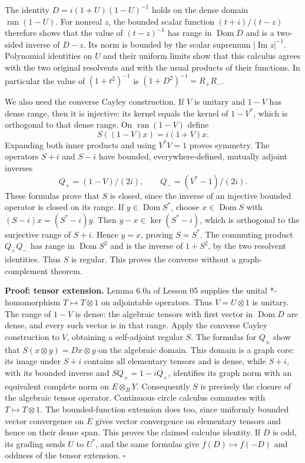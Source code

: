 \documentclass[
  11pt,
]{article}
\begin{document}
The identity \(D=i(1+U)(1-U)^{-1}\) holds on the dense domain
\(\operatorname{ran}(1-U)\). For nonreal \(z\), the bounded scalar
function \((t+i)/(t-z)\) therefore shows that the value of
\((t-z)^{-1}\) has range in \(\operatorname{Dom}D\) and is a two-sided
inverse of \(D-z\). Its norm is bounded by the scalar supremum
\(|\operatorname{Im}z|^{-1}\). Polynomial identities on \(U\) and their
uniform limits show that this calculus agrees with the two original
resolvents and with the usual products of their functions. In particular
the value of \((1+t^2)^{-1}\) is \((1+D^2)^{-1}=R_+R_-\).

We also need the converse Cayley construction. If \(V\) is unitary and
\(1-V\) has dense range, then it is injective: its kernel equals the
kernel of \(1-V^*\), which is orthogonal to that dense range. On
\(\operatorname{ran}(1-V)\) define \[
S((1-V)x)=i(1+V)x.
\] Expanding both inner products and using \(V^*V=1\) proves symmetry.
The operators \(S+i\) and \(S-i\) have bounded, everywhere-defined,
mutually adjoint inverses \[
Q_+=(1-V)/(2i),\qquad Q_-=(V^*-1)/(2i).
\] These formulas prove that \(S\) is closed, since the inverse of an
injective bounded operator is closed on its range. If
\(y\in\operatorname{Dom}S^*\), choose \(x\in\operatorname{Dom}S\) with
\((S-i)x=(S^*-i)y\). Then \(y-x\in\ker(S^*-i)\), which is orthogonal to
the surjective range of \(S+i\). Hence \(y=x\), proving \(S=S^*\). The
commuting product \(Q_+Q_-\) has range in \(\operatorname{Dom}S^2\) and
is the inverse of \(1+S^2\), by the two resolvent identities. Thus \(S\)
is regular. This proves the converse without a graph-complement theorem.

\textbf{Proof: tensor extension.} Lemma 6.0a of Lesson 05 supplies the
unital *-homomorphism \(T\mapsto T\otimes1\) on adjointable operators.
Thus \(V=U\otimes1\) is unitary. The range of \(1-V\) is dense: the
algebraic tensors with first vector in \(\operatorname{Dom}D\) are
dense, and every such vector is in that range. Apply the converse Cayley
construction to \(V\), obtaining a self-adjoint regular \(S\). The
formulas for \(Q_\pm\) show that \(S(x\otimes y)=Dx\otimes y\) on the
algebraic domain. This domain is a graph core: its image under \(S+i\)
contains all elementary tensors and is dense, while \(S+i\), with its
bounded inverse and \(S Q_+=1-iQ_+\), identifies its graph norm with an
equivalent complete norm on \(E\otimes_B Y\). Consequently \(S\) is
precisely the closure of the algebraic tensor operator. Continuous
circle calculus commutes with \(T\mapsto T\otimes1\). The
bounded-function extension does too, since uniformly bounded vector
convergence on \(E\) gives vector convergence on elementary tensors and
hence on their dense span. This proves the claimed calculus identity. If
\(D\) is odd, its grading sends \(U\) to \(U^*\), and the same formulas
give \(f(D)\mapsto f(-D)\) and oddness of the tensor extension.
\(\square\)
\end{document}

